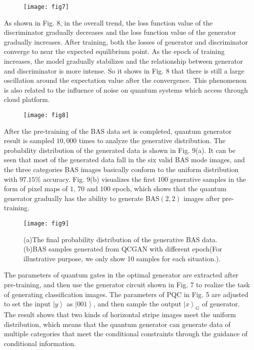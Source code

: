 \documentclass{bmcart}
\begin{document}
  \begin{figure}[h!]
  \texttt{[image: fig7]}
  \caption{}
  \end{figure}

As shown in Fig. 8, in the overall trend, the loss function value of the discriminator gradually decreases and the loss function value of the generator gradually increases. After training, both the losses of generator and discriminator converge to near the expected equilibrium point. As the epoch of training increases, the model gradually stabilizes and the relationship between generator and discriminator is more intense. So it shows in Fig. 8 that there is still a large oscillation around the expectation value after the convergence. This phenomenon is also related to the influence of noise on quantum systems which access through cloud platform.

  \begin{figure}[h!]
  \texttt{[image: fig8]}
  \caption{}
      \end{figure}

After the pre-training of the BAS data set is completed, quantum generator result is sampled $10,000$ times to analyze the generative distribution. The probability distribution of the generated data is shown in Fig. 9(a). It can be seen that most of the generated data fall in the six valid BAS mode images, and the three categories BAS images basically conform to the uniform distribution with $97.15\%$ accuracy. Fig. 9(b) visualizes the first $100$ generative samples in the form of pixel maps of $1$, $70$ and $100$ epoch, which shows that the quantum generator gradually has the ability to generate BAS$(2,2)$ images after pre-training.


  \begin{figure}[h!]
  \texttt{[image: fig9]}
  \caption{(a)The final probability distribution of the generative BAS data.(b)BAS samples generated from QCGAN with different epoch(For illustrative purpose, we only show 10 samples for each situation.).}
      \end{figure}

The parameters of quantum gates in the optimal generator are extracted after pre-training, and then use the generator circuit shown in Fig. 7 to realize the task of generating classification images. The parameters of PQC in Fig. 5 are adjusted to set the input $\left| y \right\rangle $ as $\left| {001} \right\rangle $, and then sample the output ${\left| x \right\rangle _G}$ of generator. The result shows that two kinds of horizontal stripe images meet the uniform distribution, which means that the quantum generator can generate data of multiple categories that meet the conditional constraints through the guidance of conditional information.
\end{document}
